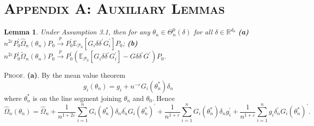 \documentclass[hidelinks, 11 pt, a4paper, pdflatex]{article}
\newtheorem{lemma}{Lemma}[section]
\renewcommand{\theequation}{\arabic{section}.\arabic{equation}}
\renewcommand{\thelemma}{\arabic{lemma}}
\begin{document}
{ \renewcommand{\thesection}{}

 \section{\textsc{Appendix A: Auxiliary Lemmas}}

  \setcounter{equation}{0}
  \renewcommand{\theequation}{A.\arabic{equation}}
  \renewcommand{\thesection}{A}
  \renewcommand{\thelemma}{A.\arabic{lemma}}

   \begin{lemma}
    Under Assumption 3.1, then for any $\theta_{n} \in \Theta_{n}^{0}(\delta)$ for all $\delta \in \mathbb{R}^{d_{\theta}}$
     \textbf{(a)} $n^{2\varepsilon }P_{0}^{\prime}\hat{\Omega}_{n}(\theta_{n})P_{0} \overset{p}{\rightarrow} P_{0}^{\prime}\mathbb{E}_{\mathcal{P}_{0}}[G_{i}\delta
      \delta^{\prime}G_{i}^{\prime}]P_{0}$;
     \textbf{(b)} $n^{2\varepsilon }P_{0}^{\prime}\tilde{\Omega}_{n}(\theta_{n})P_{0} \overset{p}{\rightarrow} P_{0}^{\prime}(\mathbb{E}_{\mathcal{P}_{0}}[G_{i}\delta
      \delta^{\prime}G_{i}^{\prime}] - G\delta \delta^{\prime}G^{\prime})P_{0}$.
   \end{lemma}

  \textsc{Proof}. \textbf{(a)}. By the mean value theorem
   \[
    g_{i}(\theta _{n})=g_{i}+n^{-\varepsilon }G_{i}(\theta _{n}^{\ast })\delta_{n}
   \]
  where $\theta_{n}^{\ast}$ is on the line segment joining $\theta_{n}$ and $\theta_{0}$. Hence
   \[
    \hat{\Omega}_{n}(\theta _{n}) = \hat{\Omega}_{n}
                                     + \frac{1}{n^{1+2\varepsilon }}
                                       \sum_{i=1}^{n}
                                       G_{i}(\theta_{n}^{\ast})\delta _{n} \delta _{n}^{\prime}G_{i}(\theta _{n}^{\ast })^{\prime}
                                     + \frac{1}{n^{1+\varepsilon}}
                                       \sum_{i=1}^{n}
                                       G_{i}(\theta_{n}^{\ast})\delta_{n}g_{i}^{\prime}
                                     + \frac{1}{n^{1+\varepsilon}}
                                       \sum_{i=1}^{n}
                                       g_{i}\delta_{n}^{\prime}G_{i}(\theta_{n}^{\ast})^{\prime}.
   \]

}
\end{document}
